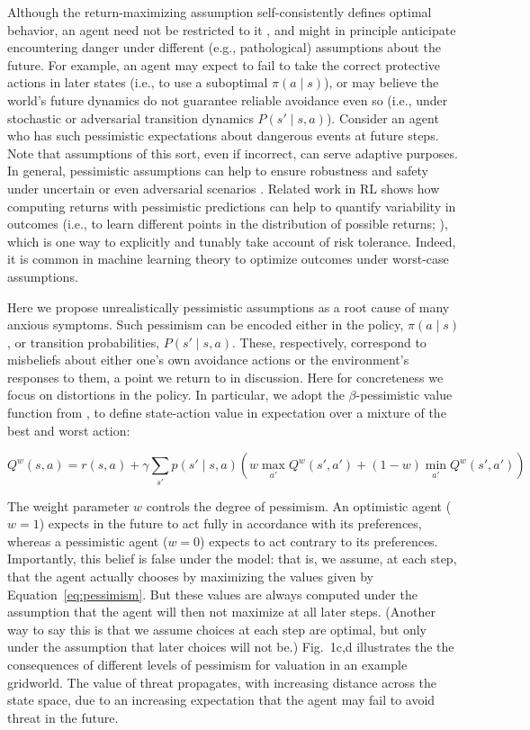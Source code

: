 \documentclass[manuscript]{stjour}
\begin{document}
Although the return-maximizing assumption self-consistently defines optimal behavior, an agent need not be restricted to it \citep{symmonds2010}, and might in principle anticipate encountering danger under different (e.g., pathological) assumptions about the future. For example, an agent may expect to fail to take the correct protective actions in later states (i.e., to use a suboptimal $\pi(a \mid s)$), or may believe the world's future dynamics do not guarantee reliable avoidance even so (i.e., under stochastic or adversarial transition dynamics $P(s' \mid s,a)$). Consider an agent who has such pessimistic expectations about dangerous events at future steps. Note that assumptions of this sort, even if incorrect, can serve adaptive purposes. In general, pessimistic assumptions can help to ensure robustness and safety under uncertain or even adversarial scenarios \citep{Garcia2015}. Related work in RL shows how computing returns with pessimistic predictions can help to quantify variability in outcomes (i.e., to learn different points in the distribution of possible returns; \citealp{bellemare2017}), which is one way to explicitly and tunably take account of risk tolerance. Indeed, it is common in machine learning theory to optimize outcomes under worst-case assumptions. 

Here we propose unrealistically pessimistic assumptions as a root cause of many anxious symptoms. Such pessimism can be encoded either in the policy, $\pi(a \mid s)$, or transition probabilities, $P(s' \mid s,a)$. These, respectively, correspond to misbeliefs about either one's own avoidance actions or the environment's responses to them, a point we return to in discussion. Here for concreteness we focus on distortions in the policy. In particular, we adopt the $\beta$-pessimistic value function from \cite{Gaskett2003}, to define state-action value in expectation over a mixture of the best and worst action:

\begin{equation}\label{eq:pessimism}
Q^w(s,a) = r(s,a) + \gamma \sum_{s'} p(s' \mid s,a) \left( w \max_{a'} Q^w(s',a') + (1 - w) \min_{a'} Q^w(s',a') \right)
\end{equation}

The weight parameter $w$ controls the degree of pessimism. An optimistic agent ($w = 1$) expects in the future to act fully in accordance with its preferences, whereas a pessimistic agent ($w = 0$) expects to act contrary to its preferences. Importantly, this belief is false under the model: that is, we assume, at each step, that the agent actually chooses by maximizing the values given by Equation~\ref{eq:pessimism}. But these values are always computed under the assumption that the agent will then not maximize at all later steps. (Another way to say this is that we assume choices at each step are optimal, but only under the assumption that later choices will not be.) Fig.~1c,d illustrates the the consequences of different levels of pessimism for valuation in an example gridworld. The value of threat propagates, with increasing distance across the state space, due to an increasing expectation that the agent may fail to avoid threat in the future.
\end{document}
